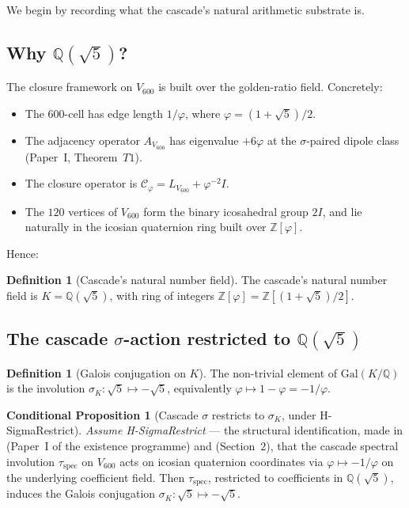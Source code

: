 \documentclass[11pt,a4paper]{article}
\theoremstyle{definition}
\newtheorem{definition}[theorem]{Definition}
\newtheorem{conditional}[theorem]{Conditional Proposition}
\theoremstyle{remark}
\begin{document}
We begin by recording what the cascade's natural arithmetic substrate is.

\subsection{Why $\mathbb{Q}(\sqrt{5})$?}

The closure framework on $V_{600}$ is built over the golden-ratio field.
Concretely:

\begin{itemize}\itemsep0pt
  \item The $600$-cell has edge length $1 / \varphi$, where $\varphi = (1 + \sqrt{5})/2$.
  \item The adjacency operator $A_{V_{600}}$ has eigenvalue $+6\varphi$ at the $\sigma$-paired dipole class (Paper~I, Theorem~$T1$).
  \item The closure operator is $\mathcal{C}_\varphi = L_{V_{600}} + \varphi^{-2} I$.
  \item The $120$ vertices of $V_{600}$ form the binary icosahedral group $2I$, and lie naturally in the icosian quaternion ring built over $\mathbb{Z}[\varphi]$.
\end{itemize}

Hence:

\begin{definition}[Cascade's natural number field]\label{def:natural_field}
The cascade's natural number field is $K = \mathbb{Q}(\sqrt{5})$, with
ring of integers $\mathbb{Z}[\varphi] = \mathbb{Z}[(1+\sqrt{5})/2]$.
\end{definition}

\subsection{The cascade $\sigma$-action restricted to $\mathbb{Q}(\sqrt{5})$}

\begin{definition}[Galois conjugation on $K$]\label{def:galois}
The non-trivial element of $\mathrm{Gal}(K/\mathbb{Q})$ is the involution
$\sigma_K : \sqrt{5} \mapsto -\sqrt{5}$, equivalently
$\varphi \mapsto 1 - \varphi = -1/\varphi$.
\end{definition}

\begin{conditional}[Cascade $\sigma$ restricts to $\sigma_K$, under H-SigmaRestrict]\label{lem:sigma_restricts}
\emph{Assume H-SigmaRestrict} --- the structural identification, made
in \cite{SmartExistenceClosure} (Paper~I of the existence programme)
and \cite{rhFormalSmart} (Section~$2$), that the cascade spectral
involution $\tau_{\mathrm{spec}}$ on $V_{600}$ acts on icosian quaternion
coordinates via $\varphi \mapsto -1/\varphi$ on the underlying
coefficient field. Then $\tau_{\mathrm{spec}}$, restricted to coefficients
in $\mathbb{Q}(\sqrt{5})$, induces the Galois conjugation
$\sigma_K : \sqrt{5} \mapsto -\sqrt{5}$.
\end{conditional}
\end{document}
